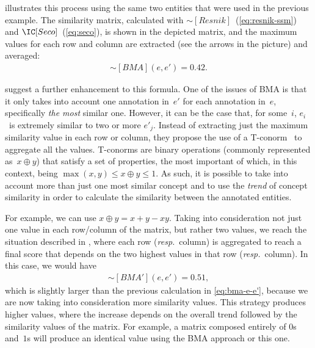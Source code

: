  illustrates this process using the same two entities that were used in the previous example. The similarity matrix, calculated with $\sim[Resnik]$~(\eqref{eq:resnik-ssm}) and $\IC[Seco]$~(\eqref{eq:seco}), is shown in the depicted matrix, and the maximum values for each row and column are extracted (see the arrows in the picture) and averaged:
\begin{eqnarray*}
    \sim[BMA](e,e') = 0.42. \label{eq:bma-e-e'}
\end{eqnarray*}

\citet{Lehmann2012a} suggest a further enhancement to this formula. One of the issues of BMA is that it only takes into account one annotation in~$e'$ for each annotation in~$e$, specifically \emph{the most} similar one. However, it can be the case that, for some~$i$, $e_i$~is extremely similar to two or more $e'_j$. Instead of extracting just the maximum similarity value in each row or column, they propose the use of a T-conorm~\citep{Klement2004} to aggregate all the values. T-conorms are binary operations (commonly represented as~$x \oplus y$) that satisfy a set of properties, the most important of which, in this context, being $\max(x,y)\leq x \oplus y \leq 1$. As such, it is possible to take into account more than just one most similar concept and to use the \emph{trend} of concept similarity in order to calculate the similarity between the annotated entities.

For example, we can use $x \oplus y = x + y - xy$. Taking into consideration not just one value in each row\slash column of the matrix, but rather two values, we reach the situation described in , where each row (\emph{resp.}~column) is aggregated to reach a final score that depends on the two highest values in that row (\emph{resp.}~column). In this case, we would have
\begin{eqnarray*}
    \sim[BMA'](e,e') = 0.51, \label{eq:bma-tconorm-e-e'}
\end{eqnarray*}
which is slightly larger than the previous calculation in \eqref{eq:bma-e-e'}, because we are now taking into consideration more similarity values. This strategy produces higher values, where the increase depends on the overall trend followed by the similarity values of the matrix. For example, a matrix composed entirely of $0$s and~$1$s will produce an identical value using the BMA approach or this one.

